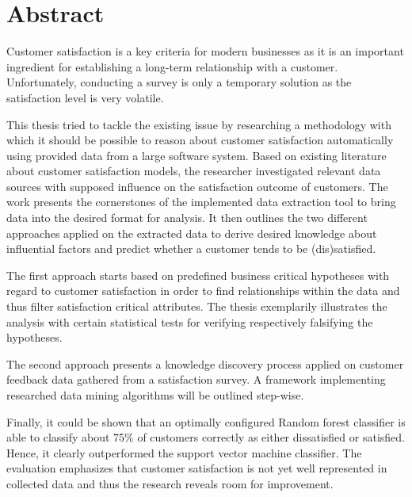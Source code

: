 \chapter*{Abstract}

Customer satisfaction is a key criteria for modern businesses as it is an important ingredient for establishing a long-term relationship with a customer. Unfortunately, conducting a survey is only a temporary solution as the satisfaction level is very volatile. 

This thesis tried to tackle the existing issue by researching a methodology with which it should be possible to reason about customer satisfaction automatically using provided data from a large software system. Based on existing literature about customer satisfaction models, the researcher investigated relevant data sources with supposed influence on the satisfaction outcome of customers. The work presents the cornerstones of the implemented data extraction tool to bring data into the desired format for analysis. It then outlines the two different approaches applied on the extracted data to derive desired knowledge about influential factors and predict whether a customer tends to be (dis)satisfied. 

The first approach starts based on predefined business critical hypotheses with regard to customer satisfaction in order to find relationships within the data and thus filter satisfaction critical attributes. The thesis exemplarily illustrates the analysis with certain statistical tests for verifying respectively falsifying the hypotheses. 

The second approach presents a knowledge discovery process applied on customer feedback data gathered from a satisfaction survey. A framework implementing researched data mining algorithms will be outlined step-wise. 

Finally, it could be shown that an optimally configured Random forest classifier is able to classify about 75\% of customers correctly as either dissatisfied or satisfied. Hence, it clearly outperformed the support vector machine classifier. The evaluation emphasizes that customer satisfaction is not yet well represented in collected data and thus the research reveals room for improvement. 

